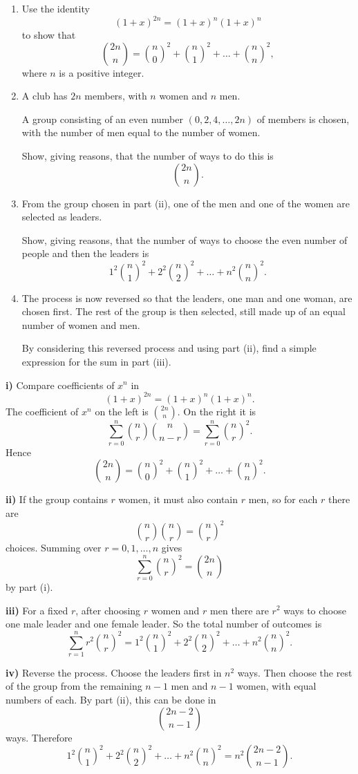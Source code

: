 \begin{problem}
\begin{enumerate}[label=\roman*)]
\item Use the identity
\[
(1+x)^{2n}=(1+x)^n(1+x)^n
\]
to show that
\[
\binom{2n}{n}=\binom{n}{0}^2+\binom{n}{1}^2+\dots+\binom{n}{n}^2,
\]
where $n$ is a positive integer.

\item A club has $2n$ members, with $n$ women and $n$ men.

A group consisting of an even number $(0,2,4,\dots,2n)$ of members is chosen, with the number of men equal to the number of women.

Show, giving reasons, that the number of ways to do this is
\[
\binom{2n}{n}.
\]

\item From the group chosen in part (ii), one of the men and one of the women are selected as leaders.

Show, giving reasons, that the number of ways to choose the even number of people and then the leaders is
\[
1^2\binom{n}{1}^2+2^2\binom{n}{2}^2+\dots+n^2\binom{n}{n}^2.
\]

\item The process is now reversed so that the leaders, one man and one woman, are chosen first. The rest of the group is then selected, still made up of an equal number of women and men.

By considering this reversed process and using part (ii), find a simple expression for the sum in part (iii).
\end{enumerate}
\end{problem}

\begin{solution}
\textbf{i)} Compare coefficients of $x^n$ in
\[
(1+x)^{2n}=(1+x)^n(1+x)^n.
\]
The coefficient of $x^n$ on the left is $\binom{2n}{n}$. On the right it is
\[
\sum_{r=0}^n \binom{n}{r}\binom{n}{n-r}
=\sum_{r=0}^n \binom{n}{r}^2.
\]
Hence
\[
\binom{2n}{n}=\binom{n}{0}^2+\binom{n}{1}^2+\dots+\binom{n}{n}^2.
\]

\textbf{ii)} If the group contains $r$ women, it must also contain $r$ men, so for each $r$ there are
\[
\binom{n}{r}\binom{n}{r}=\binom{n}{r}^2
\]
choices. Summing over $r=0,1,\dots,n$ gives
\[
\sum_{r=0}^n \binom{n}{r}^2=\binom{2n}{n}
\]
by part (i).

\textbf{iii)} For a fixed $r$, after choosing $r$ women and $r$ men there are $r^2$ ways to choose one male leader and one female leader. So the total number of outcomes is
\[
\sum_{r=1}^n r^2\binom{n}{r}^2
=1^2\binom{n}{1}^2+2^2\binom{n}{2}^2+\dots+n^2\binom{n}{n}^2.
\]

\textbf{iv)} Reverse the process. Choose the leaders first in $n^2$ ways. Then choose the rest of the group from the remaining $n-1$ men and $n-1$ women, with equal numbers of each. By part (ii), this can be done in
\[
\binom{2n-2}{n-1}
\]
ways. Therefore
\[
1^2\binom{n}{1}^2+2^2\binom{n}{2}^2+\dots+n^2\binom{n}{n}^2
=\boxed{n^2\binom{2n-2}{n-1}}.
\]
\end{solution}

